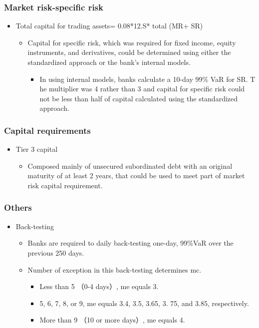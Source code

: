 \subsubsection{Market risk-specific risk}
\begin{itemize}
\item Total capital for trading assets= 0.08*12.S* total (MR+ SR)
    \begin{itemize}
    \item Capital for specific risk, which was required for fixed income, equity instruments, and derivatives, could be determined using either the standardized approach or the bank's internal models.
        \begin{itemize}
        \item In using internal models, banks calculate a 10-day 99\% VaR for SR. T he multiplier was 4 rather than 3 and capital for specific risk could not be less than half of capital calculated using the standardized approach.
        \end{itemize}
    \end{itemize}
\end{itemize}


\subsubsection{Capital requirements}
\begin{itemize}
\item Tier 3 capital
    \begin{itemize}
    \item Composed mainly of unsecured subordinated debt with an original maturity of at least 2 years, that could be used to meet part of market risk capital requirement.
    \end{itemize}
\end{itemize}


\subsubsection{Others}
\begin{itemize}
\item Back-testing
    \begin{itemize}
    \item Banks are required to daily back-testing one-day, 99\%VaR over the previous 250 days.
    \item Number of exception in this back-testing determines mc.
        \begin{itemize}
        \item Less than 5 （0-4 days）, me equals 3.
        \item 5, 6, 7, 8, or 9, me equals 3.4, 3.5, 3.65, 3. 75, and 3.85, respectively.
        \item More than 9 （10 or more days）, me equals 4.
        \end{itemize}
    \end{itemize}
\end{itemize}




